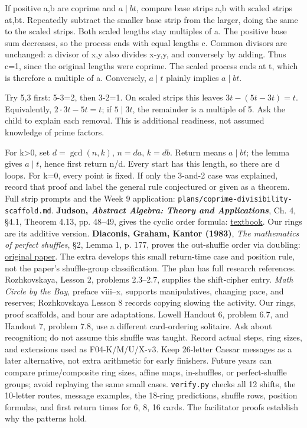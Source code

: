 \documentclass[12pt]{extarticle}
\begin{document}
\newpage
{}
If positive a,b are coprime and \(a\mid bt\), compare base strips a,b with scaled strips at,bt. Repeatedly subtract the smaller base strip from the larger, doing the same to the scaled strips. Both scaled lengths stay multiples of a. The positive base sum decreases, so the process ends with equal lengths c. Common divisors are unchanged: a divisor of x,y also divides x-y,y, and conversely by adding. Thus c=1, since the original lengths were coprime. The scaled process ends at t, which is therefore a multiple of a. Conversely, \(a\mid t\) plainly implies \(a\mid bt\).
\par
Try 5,3 first: 5-3=2, then 3-2=1. On scaled strips this leaves \(3t-(5t-3t)=t\). Equivalently, \(2\cdot3t-5t=t\); if \(5\mid3t\), the remainder is a multiple of 5. Ask the child to explain each removal. This is additional readiness, not assumed knowledge of prime factors.
\par
For k>0, set \(d=\gcd(n,k)\), \(n=da\), \(k=db\). Return means \(a\mid bt\); the lemma gives \(a\mid t\), hence first return n/d. Every start has this length, so there are d loops. For k=0, every point is fixed. If only the 3-and-2 case was explained, record that proof and label the general rule conjectured or given as a theorem. Full strip prompts and the Week 9 application: \texttt{plans/coprime-divisibility-scaffold.md}.
\textbf{Judson, \emph{Abstract Algebra: Theory and Applications}}, Ch. 4, \S4.1, Theorem 4.13, pp. 48--49, gives the cyclic order formula: \href{https://people.hsc.edu/faculty-staff/blins/books/JudsonAbstractAlgebra.pdf}{textbook}. Our rings are its additive version.
\textbf{Diaconis, Graham, Kantor (1983)}, \emph{The mathematics of perfect shuffles}, \S2, Lemma 1, p. 177, proves the out-shuffle order via doubling: \href{https://pages.uoregon.edu/kantor/PAPERS/PerfectShuffles.pdf}{original paper}. The extra develops this small return-time case and position rule, not the paper's shuffle-group classification. The plan has full research references.
Rozhkovskaya, Lesson 2, problems 2.3--2.7, supplies the shift-cipher entry. \emph{Math Circle by the Bay}, preface viii--x, supports manipulatives, changing pace, and reserves; Rozhkovskaya Lesson 8 records copying slowing the activity. Our rings, proof scaffolds, and hour are adaptations. Lowell Handout 6, problem 6.7, and Handout 7, problem 7.8, use a different card-ordering solitaire. Ask about recognition; do not assume this shuffle was taught.
Record actual steps, ring sizes, and extensions used as F04-K/M/U/X-v3. Keep 26-letter Caesar messages as a later alternative, not extra arithmetic for early finishers. Future years can compare prime/composite ring sizes, affine maps, in-shuffles, or perfect-shuffle groups; avoid replaying the same small cases.
\texttt{verify.py} checks all 12 shifts, the 10-letter routes, message examples, the 18-ring predictions, shuffle rows, position formulas, and first return times for 6, 8, 16 cards. The facilitator proofs establish why the patterns hold.
\end{document}
